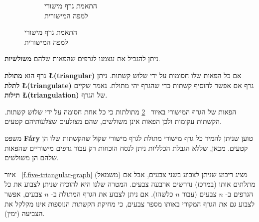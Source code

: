 \begin{figure}[tb]
\begin{center}
\begin{subfigure}{.4\textwidth}
\caption{התאמת גרף מישורי\\
למפה המישורית}
\label{f.five-planar-graph-graph}
\end{subfigure}
\end{center}
\end{figure}

ניתן להגביל את עצמנו לגרפים שהפאות שלהם
\textbf{משולשיות}.

\begin{definition}
גרף הוא
\textbf{מתולת
\L{(triangular)}}
אם כל הפאות שלו חסומות על ידי שלוש קשתות. ניתן 
\textbf{לתלת
\L{(triangulate)}}
גרף אם אפשר להוסיף קשתות כדי שהגרף יהי מתולת. נאמר שקיים 
\textbf{תילות
\L{(triangulation)}}
של הגרף.
\end{definition}
\begin{example}
הפאות של הגרף המישורי באיור%
~\ref{f.five-planar-graph-graph}
מתולתות כי כל אחת חסומה על ידי שלוש קשתות. הקשתות עקומות ולכן הפאות אינן משולשים, שהם מצולעים שצלעותיהם קטעים.
\end{example}
\begin{advanced}
משפט
\textbf{F\'{a}ry}
טוען שניתן להמיר כל גרף מישורי מתולת לגרף מישורי שקול שהקשתות שלו הן קטעים. מכאן, שללא הגבלת הכלליות ניתן לנסח הוכחות רק עבור גרפים מישוריים שהפאות שלהם הן משולשים.
\end{advanced}
\begin{example}
איור%
~\ref{f.five-triangular-graph}
(משמאל) מציג ריבוע שניתן לצבוע בשני צבעים, אבל אם מתלתים אותו (במרכז) נדרשים ארבעה צבעים. המטרה שלנו היא להוכיח שניתן לצבוע את כל הגרפים ב-%
$n$
צבעים (עבור
$n$
כלשהו). אם ניתן לצבוע את הגרף המתולת ב- 
$n$
צבעים, אפשר  לצבוע גם את הגרף המקורי באותו מספר צבעים, כי מחיקת הקשתות הנוספות אינו מקלקל את הצביעה (ימין).
\end{example}

